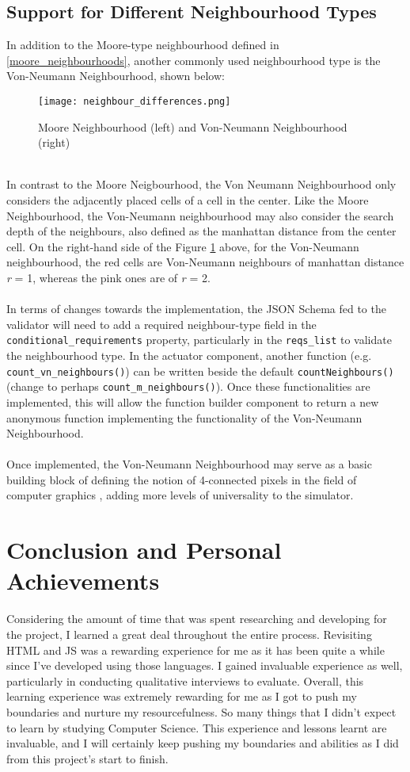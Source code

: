 \subsection{Support for Different Neighbourhood Types}
In addition to the Moore-type neighbourhood defined in \ref{moore_neighbourhoods}, another commonly used neighbourhood type is the Von-Neumann Neighbourhood, shown below:
\\
\begin{figure}[h]
    \caption{Moore Neighbourhood (left) and Von-Neumann Neighbourhood (right) \cite{toffoli1987cellular}}
    \centering
    \label{moore_vs_vn}
    \texttt{[image: neighbour\_differences.png]}
\end{figure}
\\
In contrast to the Moore Neigbourhood, the Von Neumann Neighbourhood only considers the adjacently placed cells of a cell in the center. Like the Moore Neighbourhood, the Von-Neumann neighbourhood may also consider the search depth of the neighbours, also defined as the manhattan distance from the center cell. On the right-hand side of the Figure \ref{moore_vs_vn} above, for the Von-Neumann neighbourhood, the red cells are Von-Neumann neighbours of manhattan distance \textit{r} = 1, whereas the pink ones are of \textit{r} = 2.
\\ \\
In terms of changes towards the implementation, the JSON Schema fed to the validator will need to add a required neighbour-type field in the \texttt{conditional\_requirements} property, particularly in the \texttt{reqs\_list} to validate the neighbourhood type. In the actuator component, another function (e.g. \texttt{count\_vn\_neighbours()}) can be written beside the default \texttt{countNeighbours()} (change to perhaps \texttt{count\_m\_neighbours()}). Once these functionalities are implemented, this will allow the function builder component to return a new anonymous function implementing the functionality of the Von-Neumann Neighbourhood. 
\\ \\
Once implemented, the Von-Neumann Neighbourhood may serve as a basic building block of defining the notion of 4-connected pixels in the field of computer graphics \cite{wilson2000handbook}, adding more levels of universality to the simulator.
\newpage

\section{Conclusion and Personal Achievements}
Considering the amount of time that was spent researching and developing for the project, I learned a great deal throughout the entire process. Revisiting HTML and JS was a rewarding experience for me as it has been quite a while since I've developed using those languages. I gained invaluable experience as well, particularly in conducting qualitative interviews to evaluate. Overall, this learning experience was extremely rewarding for me as I got to push my boundaries and nurture my resourcefulness. So many things that I didn't expect to learn by studying Computer Science. This experience and lessons learnt are invaluable, and I will certainly keep pushing my boundaries and abilities as I did from this project's start to finish.